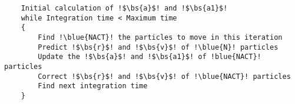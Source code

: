 \begin{lstlisting}
    Initial calculation of !$\bs{a}$! and !$\bs{a1}$!
    while Integration time < Maximum time
    {
        Find !\blue{NACT}! the particles to move in this iteration
        Predict !$\bs{r}$! and !$\bs{v}$! of !\blue{N}! particles
        Update the !$\bs{a}$! and !$\bs{a1}$! of !blue{NACT}! particles
        Correct !$\bs{r}$! and !$\bs{v}$! of !\blue{NACT}! particles
        Find next integration time
    }
\end{lstlisting}
